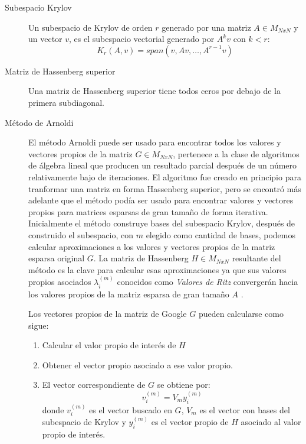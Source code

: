 \documentclass{article}
\begin{document}
\begin{description}
\item[Subespacio Krylov] Un subespacio de Krylov de orden $r$ generado por una matriz $A \in M_{NxN}$ y un vector $v$, es el subespacio vectorial generado por $A^{k}v$ con $k < r$:
\begin{equation} \label{eq:KY}
K_{r}(A,v) = span(v,Av,\ldots,A^{r-1}v)
\end{equation}

\item[Matriz de Hassenberg superior] Una matriz de Hassenberg superior tiene todos ceros por debajo de la primera subdiagonal.

 
\item[Método de Arnoldi] El método Arnoldi puede ser usado para encontrar todos los valores y vectores propios de la matriz $G \in M_{NxN}$, pertenece a la clase de algoritmos de álgebra lineal que producen un resultado parcial después de un número relativamente bajo de iteraciones. El algoritmo fue creado en principio para tranformar una matriz en forma Hassenberg superior, pero se encontró más adelante que el método podía ser usado para encontrar valores y vectores propios para matrices esparsas de gran tamaño de forma iterativa. Inicialmente el método construye bases del subespacio Krylov, después de construido el subespacio, con $m$ elegido como cantidad de bases, podemos calcular aproximaciones a los valores y vectores propios de la matriz esparsa original $G$. La matriz de Hassenberg $H \in M_{NxN}$ resultante del método es la clave para calcular esas aproximaciones ya que sus valores propios asociados $\lambda _{i}^{(m)}$ conocidos como \textit{Valores de Ritz} convergerán hacia los valores propios de la matriz esparsa de gran tamaño $A$ \cite{andersson2004investigating}.

Los vectores propios de la matriz de Google $G$ pueden calcularse como sigue:

\begin{enumerate}
  \item Calcular el valor propio de interés de $H$
  \item Obtener el vector propio asociado a ese valor propio.
  \item El vector correspondiente de $G$ se obtiene por:
  \begin{equation} \label{eq:GG}
	v_{i}^{(m)} = V_{m}y_{i}^{(m)}
\end{equation}
donde $v_{i}^{(m)}$ es el vector buscado en $G$, $V_{m}$ es el vector con bases del subespacio de Krylov y $y_{i}^{(m)}$ es el vector propio de $H$ asociado al valor propio de interés.   
  

\end{enumerate}
\end{description}
\end{document}
